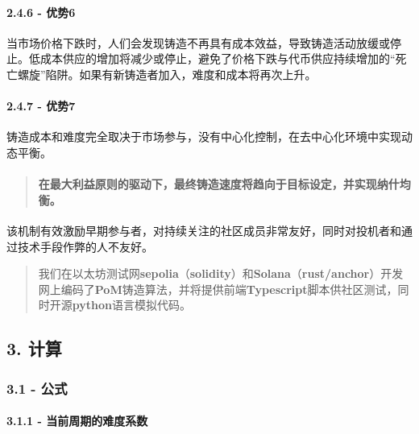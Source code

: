 \documentclass[
]{article}
\begin{document}
\paragraph{2.4.6 - 优势6}\label{ux4f18ux52bf6}

当市场价格下跌时，人们会发现铸造不再具有成本效益，导致铸造活动放缓或停止。低成本供应的增加将减少或停止，避免了价格下跌与代币供应持续增加的``死亡螺旋''陷阱。如果有新铸造者加入，难度和成本将再次上升。

\paragraph{2.4.7 - 优势7}\label{ux4f18ux52bf7}

铸造成本和难度完全取决于市场参与，没有中心化控制，在去中心化环境中实现动态平衡。

\begin{quote}
\mbox{}%
\paragraph{\texorpdfstring{\textbf{在最大利益原则的驱动下，最终铸造速度将趋向于目标设定，并实现纳什均衡}。}{在最大利益原则的驱动下，最终铸造速度将趋向于目标设定，并实现纳什均衡。}}\label{ux5728ux6700ux5927ux5229ux76caux539fux5219ux7684ux9a71ux52a8ux4e0bux6700ux7ec8ux94f8ux9020ux901fux5ea6ux5c06ux8d8bux5411ux4e8eux76eeux6807ux8bbeux5b9aux5e76ux5b9eux73b0ux7eb3ux4ec0ux5747ux8861}
\end{quote}

该机制有效激励早期参与者，对持续关注的社区成员非常友好，同时对投机者和通过技术手段作弊的人不友好。

\begin{quote}
我们在以太坊测试网\textbf{sepolia}（\textbf{solidity}）和\textbf{Solana}（\textbf{rust/anchor}）开发网上编码了\textbf{PoM}铸造算法，并将提供前端\textbf{Typescript}脚本供社区测试，同时开源\textbf{python}语言模拟代码。
\end{quote}

\subsection{3. 计算}\label{ux8ba1ux7b97}

\subsubsection{3.1 - 公式}\label{ux516cux5f0f}

\paragraph{3.1.1 -
当前周期的难度系数}\label{ux5f53ux524dux5468ux671fux7684ux96beux5ea6ux7cfbux6570}
\end{document}
